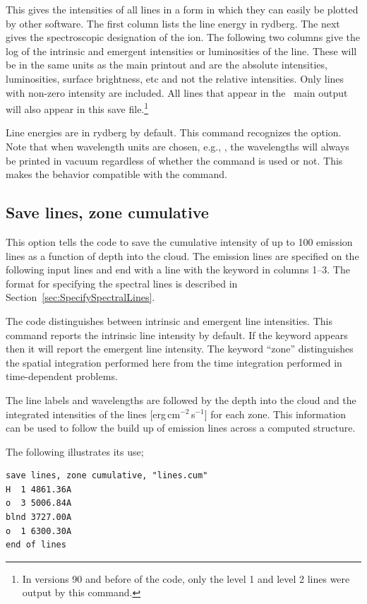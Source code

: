 This gives the intensities of all lines in a form in which they can easily
be plotted by other software.  The first column lists the line energy in
rydberg.  The next gives the spectroscopic designation of the ion.  The
following two columns give the log of the intrinsic and emergent intensities
or luminosities of the line.  These will be in the same units as the main printout
and are the absolute intensities, luminosities, surface brightness, etc and not the 
relative intensities.
Only lines with non-zero intensity are included.
All lines that appear in the \Cloudy\ main output will also appear in
this save file.\footnote{In versions 90 and before of the code, only the level 1 and level
2 lines were output by this command.}

Line energies are in rydberg by default.  This command recognizes the
 option.  Note that when wavelength units are chosen, e.g.,
, the wavelengths will always be printed in vacuum regardless
of whether the  command is used or not.  This makes
the behavior compatible with the  command.

\subsection{Save lines, zone cumulative}

This option tells the code to save the cumulative intensity
of up to 100 emission lines as a function of depth into the cloud.  The
emission lines are specified on the following input lines and end with a
line with the keyword  in columns 1--3.
The format for specifying the spectral lines is described in Section~\ref{sec:SpecifySpectralLines}.

The code distinguishes between intrinsic and emergent
line intensities.
This command reports the intrinsic line intensity by default.
If the keyword  appears then it will
report the emergent line intensity.
The keyword ``zone'' distinguishes the spatial integration performed
here from the time integration performed in time-dependent problems.

The line labels and wavelengths are followed by the depth into the cloud
and the integrated intensities of the lines [erg\,cm$^{-2}$\,s$^{-1}$] for each zone.
This information can be used to follow the build up of emission lines across
a computed structure.

The following illustrates its use;
\begin{verbatim}
save lines, zone cumulative, "lines.cum"
H  1 4861.36A
o  3 5006.84A
blnd 3727.00A
o  1 6300.30A
end of lines
\end{verbatim}

